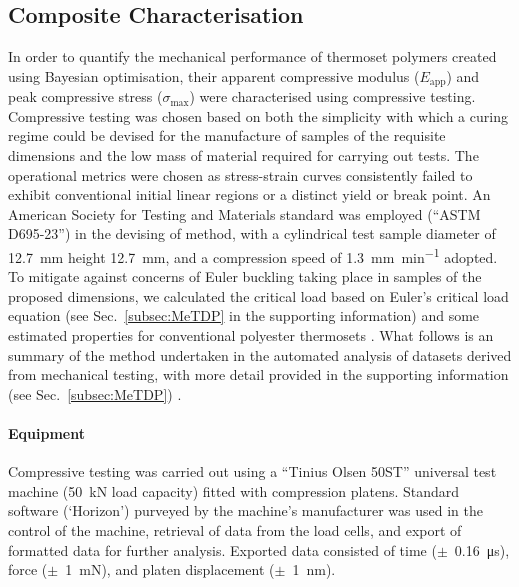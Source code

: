 \subsection{Composite Characterisation}
In order to quantify the mechanical performance of thermoset polymers 
 created using Bayesian optimisation, their apparent compressive modulus 
 (\(E_{\text{app}}\)) and peak compressive stress (\(\sigma_{\text{max}}\)) 
 were characterised using compressive testing.
Compressive testing was chosen based on both the simplicity with which 
 a curing regime could be devised for the manufacture of samples of the 
 requisite dimensions and the low mass of material required for carrying
 out tests.
The operational metrics were chosen as stress-strain curves consistently
 failed to exhibit conventional initial linear regions or a distinct yield 
 or break point.
An American Society for Testing and Materials standard was employed 
 (``ASTM D695-23'') in the devising of method, with a cylindrical test
 sample diameter of 12.7~\unit{\milli\metre} height 12.7~\unit{\milli\metre},
 and a compression speed of 1.3~\unit{\milli\metre\per\minute} adopted.
To mitigate against concerns of Euler buckling taking place in samples of
 the proposed dimensions, we calculated the critical load based on
 Euler's critical load equation (see Sec.~\ref{subsec:MeTDP} in the
 supporting information) and some
 estimated properties for conventional polyester thermosets
 \autocite{Euler1744}.
What follows is an summary of the method undertaken in the
 automated analysis of datasets derived from mechanical testing, with
 more detail provided in the supporting information
 (see Sec.~\ref{subsec:MeTDP}) .

\paragraph{Equipment}
Compressive testing was carried out using a ``Tinius Olsen 50ST''
 universal test machine (50~\unit{\kilo\newton} load capacity) fitted with
 compression platens.
Standard software (`Horizon') purveyed by the machine's manufacturer
 was used in the control of the machine, retrieval of data from the load
 cells, and export of formatted data for further analysis.
Exported data consisted of time (\(\pm\)~0.16~\unit{\micro\second}),
 force (\(\pm\)~1~\unit{\milli\newton}), and platen displacement
 (\(\pm\)~1~\unit{\nano\metre}).

